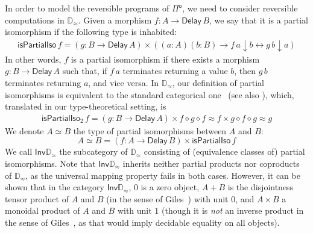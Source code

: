 \documentclass[runningheads]{llncs}
\newcommand{\Pio}{$\mathsf{\Pi}^{\mathsf{o}}$}
\newcommand{\Inv}{\mathsf{Inv}}
\newcommand{\Delay}{\mathsf{Delay}\,}
\newcommand{\dn}{\downarrow}
\newcommand{\D}{\mathbb{D}}
\newcommand{\Dapprox}{\mathbb{D}_{\approx}}
\newcommand{\piso}{\mathsf{isPartialIso}}
\newcommand{\pisoalt}{\mathsf{isPartialIso}_2}
\begin{document}
In order to model the reversible programs of \Pio, we need to consider
reversible computations in $\Dapprox$. Given a morphism $f : A \to
\Delay B$, we say that it is a partial isomorphism if the following
type is inhabited:
\begin{align*}
\piso \,f = (g : B \to \Delay A) \times \left( (a : A) (b : B) \to  f
  \,a \dn b \leftrightarrow g \,b \dn a  \right)  
\end{align*}
In other words, $f$ is a partial isomorphism if there exists a
morphism $g : B \to \Delay A$ such that, if $f\,a$ terminates
returning a value $b$, then $g\,b$ terminates returning $a$, and vice
versa. In $\Dapprox$, our definition of partial isomorphisms is equivalent to
the standard categorical one~\cite{Kastl79} (see also \cite{CockettL02}),
which, translated in our type-theoretical setting, is
\begin{align*}
\pisoalt \,f = (g : B \to \Delay A) \times f \diamond g \diamond
  f \approx f \times g \diamond f \diamond g \approx g 
\end{align*}
We denote $A \simeq B$ the type of partial isomorphisms between
$A$ and $B$:
\[
A \simeq B = (f : A \to \Delay B) \times \piso \,f
\]
We call $\Inv \Dapprox$ the subcategory of $\Dapprox$ consisting of
(equivalence classes of) partial isomorphisms. Note that $\Inv\Dapprox$
inherits neither partial products nor coproducts of $\Dapprox$, as the
universal mapping property fails in both cases. However, it can be shown that
in the category $\Inv\Dapprox$, $0$ is a zero object, $A + B$ is the
disjointness tensor product of $A$ and $B$ (in the sense of Giles~\cite{Giles})
with unit $0$, and $A \times B$ a monoidal product of $A$ and $B$ with unit $1$
(though it is \emph{not} an inverse product in the sense of
Giles~\cite{Giles}, as that would imply decidable equality on all objects).



\end{document}
